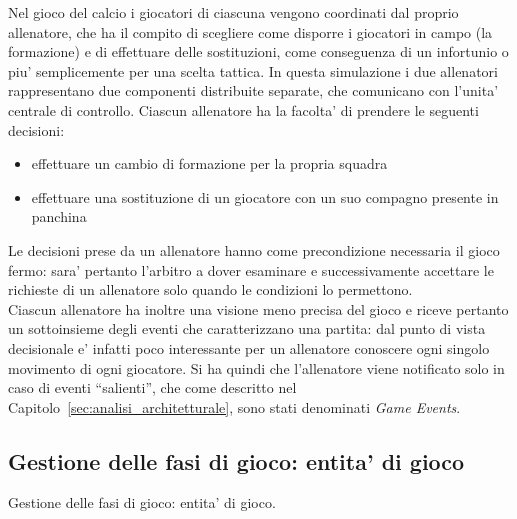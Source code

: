 
Nel gioco del calcio i giocatori di ciascuna vengono coordinati dal proprio allenatore, che ha il compito di scegliere come disporre i giocatori in campo (la formazione) e di effettuare delle sostituzioni, come conseguenza di un infortunio o piu' semplicemente per una scelta tattica. In questa simulazione i due allenatori rappresentano due componenti distribuite separate, che comunicano con l'unita' centrale di controllo. Ciascun allenatore ha la facolta' di prendere le seguenti decisioni:

\begin{itemize}
	\item effettuare un cambio di formazione per la propria squadra
	\item effettuare una sostituzione di un giocatore con un suo compagno presente in panchina
\end{itemize}

Le decisioni prese da un allenatore hanno come precondizione necessaria il gioco fermo: sara' pertanto l'arbitro a dover esaminare e successivamente accettare le richieste di un allenatore solo quando le condizioni lo permettono.\\

Ciascun allenatore ha inoltre una visione meno precisa del gioco e riceve pertanto un sottoinsieme degli eventi che caratterizzano una partita: dal punto di vista decisionale e' infatti poco interessante per un allenatore conoscere ogni singolo movimento di ogni giocatore. Si ha quindi che l'allenatore viene notificato solo in caso di eventi ``salienti'', che come descritto nel Capitolo~\ref{sec:analisi_architetturale}, sono stati denominati \textit{Game Events}.

\subsection*{Gestione delle fasi di gioco: entita' di gioco}
%
\label{sec:modello_fasi_game_entity}

Gestione delle fasi di gioco: entita' di gioco.
